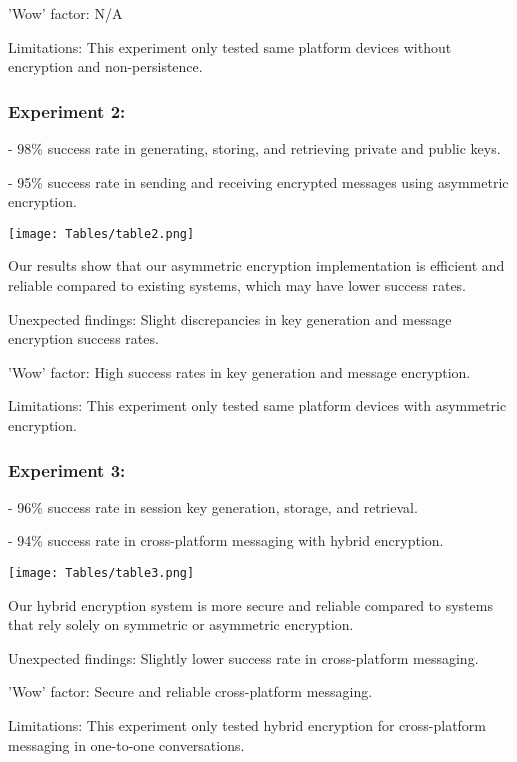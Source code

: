 \documentclass[12pt]{article}
\begin{document}
'Wow' factor: N/A

Limitations: This experiment only tested same platform devices without encryption and non-persistence.

\subsubsection{Experiment 2:}
- 98\% success rate in generating, storing, and retrieving private and public keys.

- 95\% success rate in sending and receiving encrypted messages using asymmetric encryption.

\begin{center}
\texttt{[image: Tables/table2.png]}
\end{center}

Our results show that our asymmetric encryption implementation is efficient and reliable compared to existing systems, which may have lower success rates.

Unexpected findings: Slight discrepancies in key generation and message encryption success rates.

'Wow' factor: High success rates in key generation and message encryption.

Limitations: This experiment only tested same platform devices with asymmetric encryption.

\subsubsection{Experiment 3:}

- 96\% success rate in session key generation, storage, and retrieval.

- 94\% success rate in cross-platform messaging with hybrid encryption.

\begin{center}
\texttt{[image: Tables/table3.png]}
\end{center}

Our hybrid encryption system is more secure and reliable compared to systems that rely solely on symmetric or asymmetric encryption.

Unexpected findings: Slightly lower success rate in cross-platform messaging.

'Wow' factor: Secure and reliable cross-platform messaging.

Limitations: This experiment only tested hybrid encryption for cross-platform messaging in one-to-one conversations.
\end{document}
